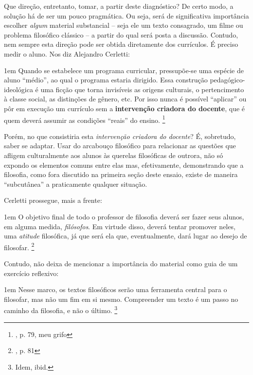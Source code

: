\documentclass[12pt,a4paper]{article}
\newenvironment{citac}{
	\begin{addmargin}[4cm]{1em} \footnotesize}{\normalfont \end{addmargin}
}
\begin{document}
	Que direção, entretanto, tomar, a partir deste diagnóstico? De certo 
	modo, a solução há de ser um pouco pragmática. Ou seja, será de 
	significativa importância escolher \emph{algum} material substancial
	-- seja ele um texto consagrado, um filme ou problema filosófico 
	clássico -- a partir do qual será posta a discussão. Contudo, nem 
	sempre esta direção pode ser obtida diretamente dos currículos. É 
	preciso medir o aluno. Nos diz Alejandro Cerletti: 

	\begin{citac}
		Quando se estabelece um programa curricular, pressupõe-se 
		uma espécie de aluno “médio”, ao qual o programa estaria 
		dirigido. Essa construção pedagógico-ideológica é uma 
		ficção que torna invisíveis as origens culturais, o 
		pertencimento à classe social, as distinções de gênero, 
		etc. Por isso nunca é possível “aplicar” ou pôr em 
		execução um currículo sem a \textbf{intervenção 
		criadora do docente}, que é quem deverá assumir as 
		condições “reais” do ensino. 
		\footnote{\cite{cerletti}, p. 79, meu grifo}
	\end{citac}

	Porém, no que consistiria esta \emph{intervenção criadora do docente}? 
	É, sobretudo, saber se adaptar. Usar do arcabouço filosófico para 
	relacionar as questões que afligem culturalmente aos alunos às 
	querelas filosóficas de outrora, não só expondo os elementos comuns 
	entre elas mas, efetivamente, demonstrando que a filosofia, como 
	fora discutido na primeira seção deste ensaio, existe de maneira 
	“subcutânea” a praticamente qualquer situação. 

	Cerletti prossegue, mais a frente: 

	\begin{citac}
		O objetivo final de todo o professor de filosofia deverá ser
		fazer seus alunos, em alguma medida, \textit{filósofos}. Em 
		virtude disso, deverá tentar promover neles, uma \textit{
		atitude} filosófica, já que será ela que, eventualmente, dará 
		lugar ao desejo de filosofar. 
		\footnote{\cite{cerletti}, p. 81}
	\end{citac}

	Contudo, não deixa de mencionar a importância do material como 
	guia de um exercício reflexivo: 
	
	\begin{citac}
		Nesse marco, os textos filosóficos serão uma ferramenta 
		central para o filosofar, mas não um fim em si mesmo. 
		Compreender um texto é um passo no caminho da filosofia, 
		e não o último. 
		\footnote{Idem, ibid.}
	\end{citac}
\end{document}
